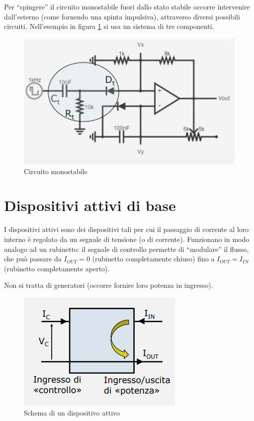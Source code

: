 \documentclass{article}
\begin{document}
Per ``spingere” il circuito monostabile fuori dallo stato stabile occorre intervenire dall’esterno (come fornendo una spinta impulsiva), attraverso diversi possibili circuiti. Nell'esempio in figura \ref{Schema_circuito_monostabile_bis} si usa un sistema di tre componenti.

\begin{figure}[h]
  \centering
  \includegraphics[scale=0.7]{IM_circuito_monostabile_bis}
  \caption{Circuito monostabile}
  \label{Schema_circuito_monostabile_bis}
\end{figure}

\clearpage
















\section{Dispositivi attivi di base}

I dispositivi attivi sono dei dispositivi tali per cui il passaggio di corrente al loro interno è regolato da un segnale di tensione (o di corrente). Funzionano in modo analogo ad un rubinetto: il segnale di controllo permette di ``modulare'' il flusso, che può passare da $I_{OUT} = 0$ (rubinetto completamente chiuso) fino a $I_{OUT} = I_{IN}$ (rubinetto completamente aperto).

Non si tratta di generatori (occorre fornire loro potenza in ingresso).

\begin{figure}[h]
  \centering
  \includegraphics[scale=0.6]{IM_dispositivo_attivo_base}
  \caption{Schema di un dispositivo attivo}
  \label{Schema_dispositivo_attivo_base}
\end{figure}
\end{document}
